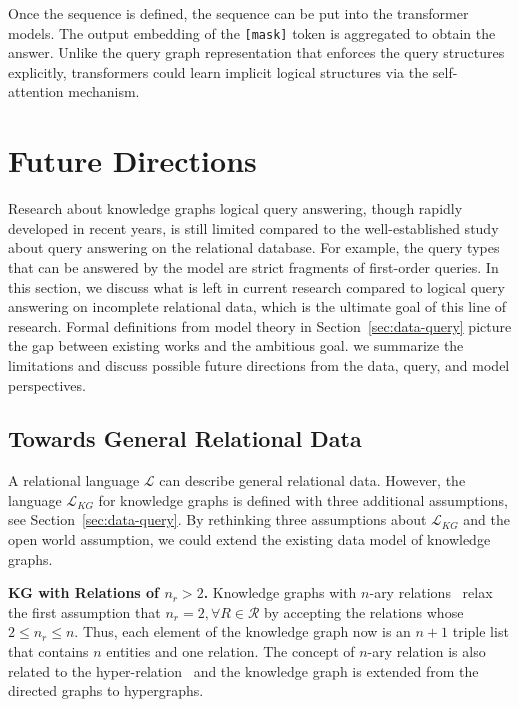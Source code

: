 \documentclass[11pt]{article}
\newcommand{\relation}{\mathcal{R}}
\newcommand{\lang}{\mathcal{L}}
\begin{document}
Once the sequence is defined, the sequence can be put into the transformer models. The output embedding of the \texttt{[mask]} token is aggregated to obtain the answer. Unlike the query graph representation that enforces the query structures explicitly, transformers could learn implicit logical structures via the self-attention mechanism.

\section{Future Directions}\label{sec:future}
Research about knowledge graphs logical query answering, though rapidly developed in recent years, is still limited compared to the well-established study about query answering on the relational database. For example, the query types that can be answered by the model are strict fragments of first-order queries. 
In this section, we discuss what is left in current research compared to logical query answering on incomplete relational data, which is the ultimate goal of this line of research. Formal definitions from model theory in Section~\ref{sec:data-query} picture the gap between existing works and the ambitious goal. we summarize the limitations and discuss possible future directions from the data, query, and model perspectives.

\subsection{Towards General Relational Data}
A relational language $\lang$ can describe general relational data. However, the language $\lang_{KG}$ for knowledge graphs is defined with three additional assumptions, see Section~\ref{sec:data-query}. By rethinking three assumptions about $\lang_{KG}$ and the open world assumption, we could extend the existing data model of knowledge graphs.

\noindent\textbf{KG with Relations of $n_r > 2$.} Knowledge graphs with $n$-ary relations~\cite{Zhang2022FactTreeReasoning} relax the first assumption that $n_r=2, \forall R\in \relation$ by accepting the relations whose $2\leq n_r \leq n$. Thus, each element of the knowledge graph now is an $n+1$ triple list that contains $n$ entities and one relation. The concept of $n$-ary relation is also related to the hyper-relation~\cite{Galkin2020MessagePassing,Alivanistos2022QueryEmbedding} and the knowledge graph is extended from the directed graphs to hypergraphs.
\end{document}
